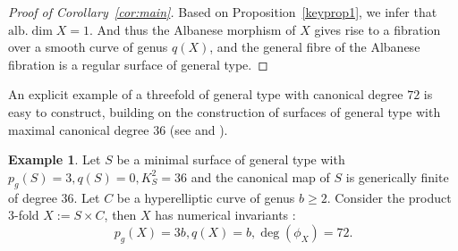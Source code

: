 \documentclass[11pt]{amsart}
\theoremstyle{plain}
\theoremstyle{definition}
\newtheorem{example}[thm]{Example}
\numberwithin{equation}{section}
\newcommand{\alb}{\mathrm{alb}}
\begin{document}
\begin{proof}[Proof of Corollary~\ref{cor:main}]
Based on Proposition~\ref{keyprop1}, we infer that $\alb.\dim X=1$.  And thus the Albanese morphism of $X$ gives rise to a fibration over a smooth  curve of genus $q(X)$, and the general fibre of the Albanese fibration is a regular surface of general type.
\end{proof}
\fi
An explicit example of a threefold of general type with canonical degree 
$72$ is easy to construct, building on the construction of surfaces of general type with maximal canonical degree $36$ (see \cite{LY21}  and \cite{Rit22}).
\begin{example}
    Let $S$ be a minimal surface of general type with $p_g(S)=3, q(S)=0, K_S^2=36$ and the canonical map of $S$ is generically finite of degree $36$. Let $C$ be a hyperelliptic curve of genus $b\geq 2$. Consider the product $3$-fold $X:=S\times C$, then $X$ has numerical invariants :
    \[
    p_g(X)=3b, q(X)=b, \deg(\phi_X)=72.
    \]
\end{example}



\end{document}
